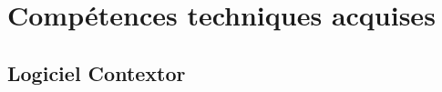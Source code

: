 \documentclass[a4paper,twoside,12pt,openright]{report}
\begin{document}
\chapter{Compétences techniques acquises}
\section{Logiciel Contextor}
\end{document}
